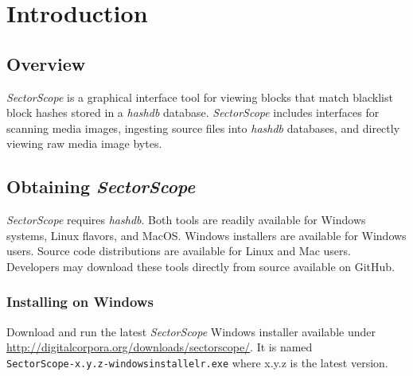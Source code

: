 \documentclass[11pt,fleqn]{article} %
\begin{document}
\newcommand \sscope {\textit{SectorScope}\xspace}
\newcommand \hdb {\textit{hashdb}\xspace}
\newcommand \aut {\textit{Autopsy}\xspace}
\newcommand \bulk {\textit{bulk\_extractor}\xspace}





\setlength{\parindent}{0pt} %
\newpage
\thispagestyle{empty}
\mbox{}
\newpage

\tableofcontents
\newpage
{}
\newpage

\section{Introduction}
\subsection {Overview}
\sscope is a graphical interface tool for viewing blocks that match blacklist block hashes stored in a \hdb database. \sscope includes interfaces for scanning media images, ingesting source files into \hdb databases, and directly viewing raw media image bytes.\\

\subsection{Obtaining \sscope}
\label{Obtaining}
\sscope requires \hdb. Both tools are readily available for Windows systems, Linux flavors, and MacOS.  Windows installers are available for Windows users.  Source code distributions are available for Linux and Mac users.  Developers may download these tools directly from source available on GitHub.\\

\subsubsection{Installing on Windows}
Download and run the latest \sscope Windows installer available under \url{http://digitalcorpora.org/downloads/sectorscope/}. It is named\\
\verb+SectorScope-x.y.z-windowsinstallelr.exe+ where x.y.z is the latest version.\\
\end{document}
